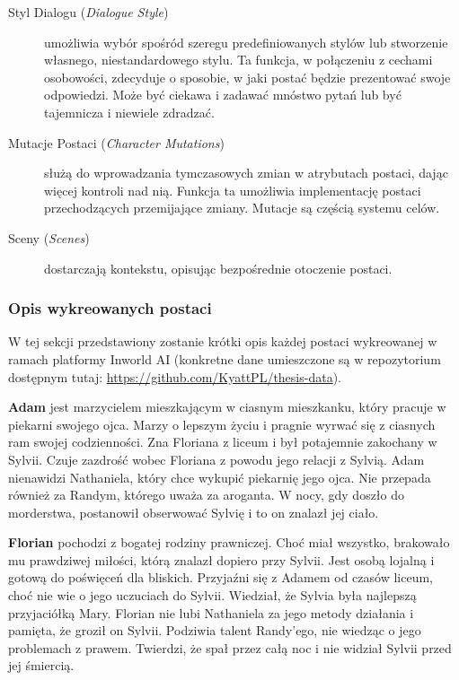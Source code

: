 \begin{description}
    \item[Styl Dialogu (\textit{Dialogue Style})] umożliwia wybór spośród szeregu predefiniowanych stylów lub stworzenie
          własnego, niestandardowego stylu. Ta funkcja, w połączeniu z cechami osobowości, zdecyduje o
          sposobie, w jaki postać będzie prezentować swoje odpowiedzi. Może być ciekawa i zadawać mnóstwo pytań
          lub być tajemnicza i niewiele zdradzać\cite{inworld_docs}.

    \item[Mutacje Postaci (\textit{Character Mutations})] służą do wprowadzania tymczasowych zmian w atrybutach
          postaci, dając więcej kontroli nad nią. Funkcja ta umożliwia implementację postaci przechodzących
          przemijające zmiany. Mutacje są częścią systemu celów\cite{inworld_docs}.

    \item[Sceny (\textit{Scenes})] dostarczają kontekstu, opisując bezpośrednie otoczenie postaci\cite{inworld_docs}.

\end{description}

\subsubsection*{Opis wykreowanych postaci}

W tej sekcji przedstawiony zostanie krótki opis każdej postaci wykreowanej w ramach platformy Inworld AI
(konkretne dane umieszczone są w repozytorium dostępnym tutaj: \href{https://github.com/KyattPL/thesis-data}{https://github.com/KyattPL/thesis-data}).

\textbf{Adam} jest marzycielem mieszkającym w ciasnym mieszkanku, który pracuje w piekarni swojego ojca.
Marzy o lepszym życiu i pragnie wyrwać się z ciasnych ram swojej codzienności. Zna Floriana z liceum i był
potajemnie zakochany w Sylvii. Czuje zazdrość wobec Floriana z powodu jego relacji z Sylvią.
Adam nienawidzi Nathaniela, który chce wykupić piekarnię jego ojca. Nie przepada również za
Randym, którego uważa za aroganta. W nocy, gdy doszło do morderstwa, postanowił obserwować Sylvię
i to on znalazł jej ciało.

\textbf{Florian} pochodzi z bogatej rodziny prawniczej. Choć miał wszystko, brakowało mu prawdziwej miłości,
którą znalazł dopiero przy Sylvii. Jest osobą lojalną i gotową do poświęceń dla bliskich. Przyjaźni
się z Adamem od czasów liceum, choć nie wie o jego uczuciach do Sylvii. Wiedział, że Sylvia
była najlepszą przyjaciółką Mary. Florian nie lubi Nathaniela za jego metody działania i pamięta, że groził
on Sylvii. Podziwia talent Randy'ego, nie wiedząc o jego problemach z prawem. Twierdzi, że spał przez całą
noc i nie widział Sylvii przed jej śmiercią.

